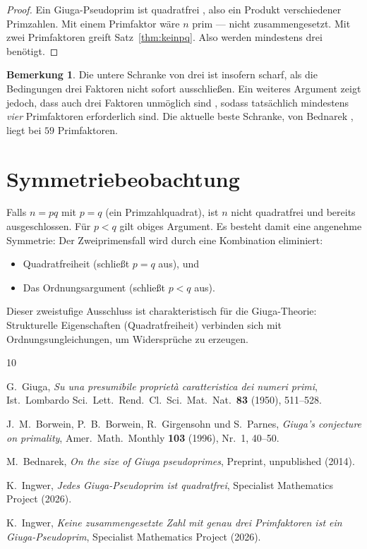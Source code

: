 \documentclass[12pt,a4paper]{amsart}
\theoremstyle{definition}
\newtheorem{remark}[theorem]{Bemerkung}
\begin{document}
\begin{proof}
Ein Giuga-Pseudoprim ist quadratfrei \cite{Ingwer2026qfrei}, also ein Produkt
verschiedener Primzahlen. Mit einem Primfaktor wäre $n$ prim — nicht zusammengesetzt.
Mit zwei Primfaktoren greift Satz~\ref{thm:keinpq}. Also werden mindestens drei benötigt.
\end{proof}

\begin{remark}
Die untere Schranke von drei ist insofern scharf, als die Bedingungen drei Faktoren
nicht sofort ausschließen. Ein weiteres Argument zeigt jedoch, dass auch drei Faktoren
unmöglich sind \cite{Ingwer2026a}, sodass tatsächlich mindestens \emph{vier}
Primfaktoren erforderlich sind. Die aktuelle beste Schranke, von Bednarek
\cite{Bednarek2014}, liegt bei $59$ Primfaktoren.
\end{remark}

\section{Symmetriebeobachtung}

Falls $n = pq$ mit $p = q$ (ein Primzahlquadrat), ist $n$ nicht quadratfrei und
bereits ausgeschlossen. Für $p < q$ gilt obiges Argument. Es besteht damit eine
angenehme Symmetrie: Der Zweiprimensfall wird durch eine Kombination eliminiert:
\begin{itemize}
  \item Quadratfreiheit (schließt $p = q$ aus), und
  \item Das Ordnungsargument (schließt $p < q$ aus).
\end{itemize}

Dieser zweistufige Ausschluss ist charakteristisch für die Giuga-Theorie: Strukturelle
Eigenschaften (Quadratfreiheit) verbinden sich mit Ordnungsungleichungen, um Widersprüche
zu erzeugen.

\begin{thebibliography}{10}

G.~Giuga,
\emph{Su una presumibile propriet\`a caratteristica dei numeri primi},
Ist.\ Lombardo Sci.\ Lett.\ Rend.\ Cl.\ Sci.\ Mat.\ Nat.\ \textbf{83}
(1950), 511--528.

J.~M.~Borwein, P.~B.~Borwein, R.~Girgensohn und S.~Parnes,
\emph{Giuga's conjecture on primality},
Amer.\ Math.\ Monthly \textbf{103} (1996), Nr.\ 1, 40--50.

M.~Bednarek,
\emph{On the size of Giuga pseudoprimes},
Preprint, unpublished (2014).

K.~Ingwer,
\emph{Jedes Giuga-Pseudoprim ist quadratfrei},
Specialist Mathematics Project (2026).

K.~Ingwer,
\emph{Keine zusammengesetzte Zahl mit genau drei Primfaktoren ist ein Giuga-Pseudoprim},
Specialist Mathematics Project (2026).

\end{thebibliography}
\end{document}
